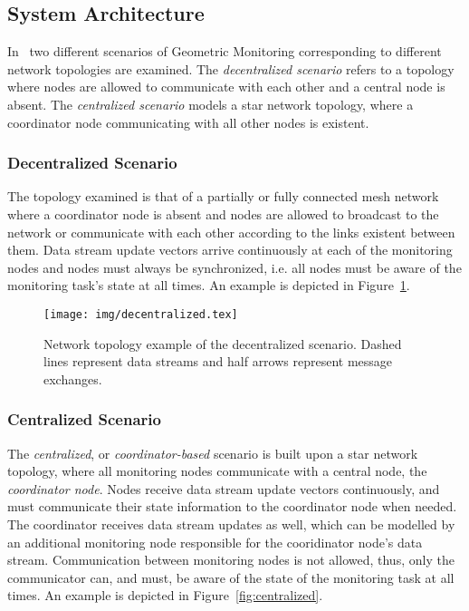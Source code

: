 \newpage
\subsection{System Architecture} \label{subsec:theorBack-GM-sysArch}

In~\cite{Sharfman2006GM} two different scenarios of Geometric Monitoring corresponding to different network topologies are examined. The \emph{decentralized scenario} refers to a topology where nodes are allowed to communicate with each other and a central node is absent. The \emph{centralized scenario} models a star network topology, where a coordinator node communicating with all other nodes is existent.

\subsubsection{Decentralized Scenario} \label{subsubsec:theorBack-GM-decentralized}

The topology examined is that of a partially or fully connected mesh network where a coordinator node is absent and nodes are allowed to broadcast to the network or communicate with each other according to the links existent between them. Data stream update vectors arrive continuously at each of the monitoring nodes and nodes must always be synchronized, i.e. all nodes must be aware of the monitoring task's state at all times. An example is depicted in Figure~\ref{fig:decentralized}.

\begin{figure}[H]
\centering
\texttt{[image: img/decentralized.tex]}
\caption{Network topology example of the decentralized scenario. Dashed lines represent data streams and half arrows represent message exchanges.} 
\label{fig:decentralized}
\end{figure}

\subsubsection{Centralized Scenario}\label{subsubsec:theorBack-GM-centralized}

The \emph{centralized}, or \emph{coordinator-based} scenario is built upon a star network topology, where all monitoring nodes communicate with a central node, the \emph{coordinator node}. Nodes receive data stream update vectors continuously, and must communicate their state information to the coordinator node when needed. The coordinator receives data stream updates as well, which can be modelled by an additional monitoring node responsible for the cooridinator node's data stream. Communication between monitoring nodes is not allowed, thus, only the communicator can, and must, be aware of the state of the monitoring task at all times. An example is depicted in Figure~\ref{fig:centralized}.


